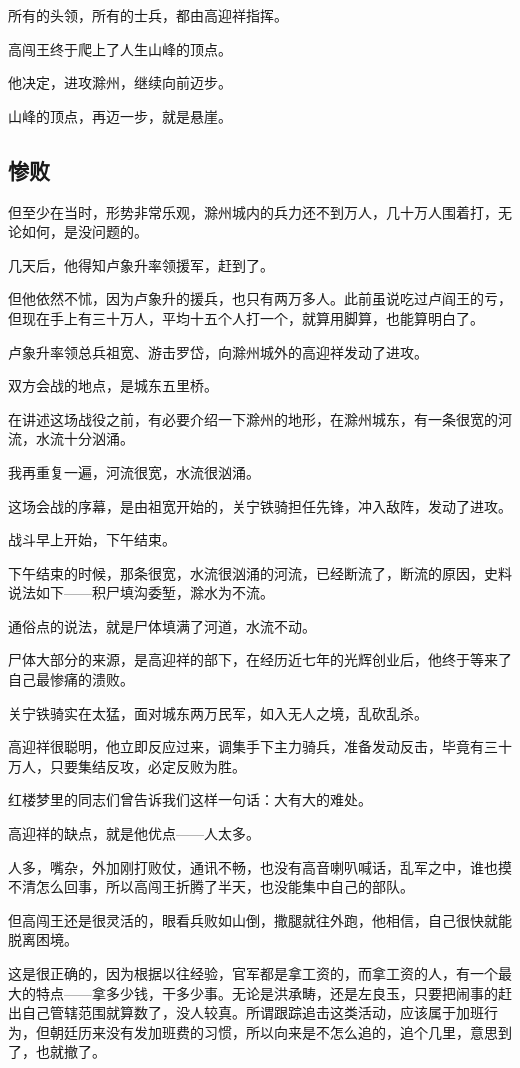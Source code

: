 \begin{multicols}{\theparacolNo}
		所有的头领，所有的士兵，都由高迎祥指挥。

		高闯王终于爬上了人生山峰的顶点。

		他决定，进攻滁州，继续向前迈步。

		山峰的顶点，再迈一步，就是悬崖。

		\subsection{惨败}
		但至少在当时，形势非常乐观，滁州城内的兵力还不到万人，几十万人围着打，无论如何，是没问题的。

		几天后，他得知卢象升率领援军，赶到了。

		但他依然不怵，因为卢象升的援兵，也只有两万多人。此前虽说吃过卢阎王的亏，但现在手上有三十万人，平均十五个人打一个，就算用脚算，也能算明白了。

		卢象升率领总兵祖宽、游击罗岱，向滁州城外的高迎祥发动了进攻。

		双方会战的地点，是城东五里桥。

		在讲述这场战役之前，有必要介绍一下滁州的地形，在滁州城东，有一条很宽的河流，水流十分汹涌。

		我再重复一遍，河流很宽，水流很汹涌。

		这场会战的序幕，是由祖宽开始的，关宁铁骑担任先锋，冲入敌阵，发动了进攻。

		战斗早上开始，下午结束。

		下午结束的时候，那条很宽，水流很汹涌的河流，已经断流了，断流的原因，史料说法如下——积尸填沟委堑，滁水为不流。

		通俗点的说法，就是尸体填满了河道，水流不动。

		尸体大部分的来源，是高迎祥的部下，在经历近七年的光辉创业后，他终于等来了自己最惨痛的溃败。

		关宁铁骑实在太猛，面对城东两万民军，如入无人之境，乱砍乱杀。

		高迎祥很聪明，他立即反应过来，调集手下主力骑兵，准备发动反击，毕竟有三十万人，只要集结反攻，必定反败为胜。

		红楼梦里的同志们曾告诉我们这样一句话：大有大的难处。

		高迎祥的缺点，就是他优点——人太多。

		人多，嘴杂，外加刚打败仗，通讯不畅，也没有高音喇叭喊话，乱军之中，谁也摸不清怎么回事，所以高闯王折腾了半天，也没能集中自己的部队。

		但高闯王还是很灵活的，眼看兵败如山倒，撒腿就往外跑，他相信，自己很快就能脱离困境。

		这是很正确的，因为根据以往经验，官军都是拿工资的，而拿工资的人，有一个最大的特点——拿多少钱，干多少事。无论是洪承畴，还是左良玉，只要把闹事的赶出自己管辖范围就算数了，没人较真。所谓跟踪追击这类活动，应该属于加班行为，但朝廷历来没有发加班费的习惯，所以向来是不怎么追的，追个几里，意思到了，也就撤了。


\end{multicols}
